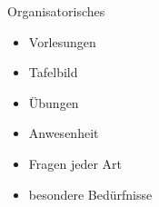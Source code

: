 \begin{frame}
	\titlepage
\end{frame}


\begin{frame}{Organisatorisches}
	\begin{itemize}
		\item Vorlesungen
		\item Tafelbild
		\item Übungen
		\item Anwesenheit
		\item Fragen jeder Art
		\item besondere Bedürfnisse
	\end{itemize}
\end{frame}

\AtBeginSection{
	\begin{frame}
		\sectionpage
		\tableofcontents[sectionstyle=hide/hide,subsectionstyle=show/show/hide]
	\end{frame}
}

